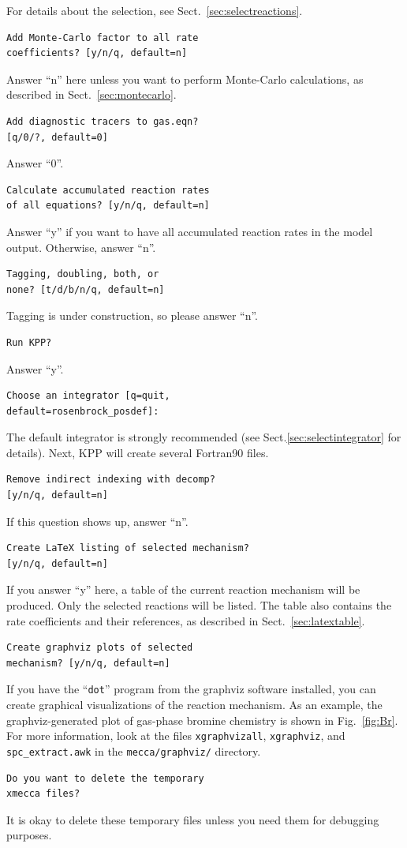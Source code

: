 \documentclass[twoside]{article}
\begin{document}
For details about the selection, see Sect.~\ref{sec:selectreactions}.
\begin{verbatim}
Add Monte-Carlo factor to all rate
coefficients? [y/n/q, default=n]
\end{verbatim}
Answer ``n'' here unless you want to perform Monte-Carlo calculations,
as described in Sect.~\ref{sec:montecarlo}.
\begin{verbatim}
Add diagnostic tracers to gas.eqn?
[q/0/?, default=0]
\end{verbatim}
Answer ``0''.
\begin{verbatim}
Calculate accumulated reaction rates
of all equations? [y/n/q, default=n]
\end{verbatim}
Answer ``y'' if you want to have all accumulated reaction rates in the
model output. Otherwise, answer ``n''.
\begin{verbatim}
Tagging, doubling, both, or
none? [t/d/b/n/q, default=n]
\end{verbatim}
Tagging is under construction, so please answer ``n''. %
\begin{verbatim}
Run KPP?
\end{verbatim}
Answer ``y''.
\begin{verbatim}
Choose an integrator [q=quit,
default=rosenbrock_posdef]:
\end{verbatim}
The default integrator is strongly recommended (see
Sect.\ref{sec:selectintegrator} for details). Next, KPP will create
several Fortran90 files.
\begin{verbatim}
Remove indirect indexing with decomp?
[y/n/q, default=n]
\end{verbatim}
If this question shows up, answer ``n''.
\begin{verbatim}
Create LaTeX listing of selected mechanism?
[y/n/q, default=n]
\end{verbatim}
If you answer ``y'' here, a table of the current reaction mechanism will
be produced. Only the selected reactions will be listed. The table also
contains the rate coefficients and their references, as described in
Sect.~\ref{sec:latextable}.
\begin{verbatim}
Create graphviz plots of selected
mechanism? [y/n/q, default=n]
\end{verbatim}
If you have the ``\verb|dot|'' program from the graphviz software
installed, you can create graphical visualizations of the reaction
mechanism. As an example, the graphviz-generated plot of gas-phase
bromine chemistry is shown in Fig.~\ref{fig:Br}. For more information,
look at the files \verb|xgraphvizall|, \verb|xgraphviz|, and
\verb|spc_extract.awk| in the \verb|mecca/graphviz/| directory.
\begin{verbatim}
Do you want to delete the temporary
xmecca files?
\end{verbatim}
It is okay to delete these temporary files unless you need them for
debugging purposes.
\end{document}
